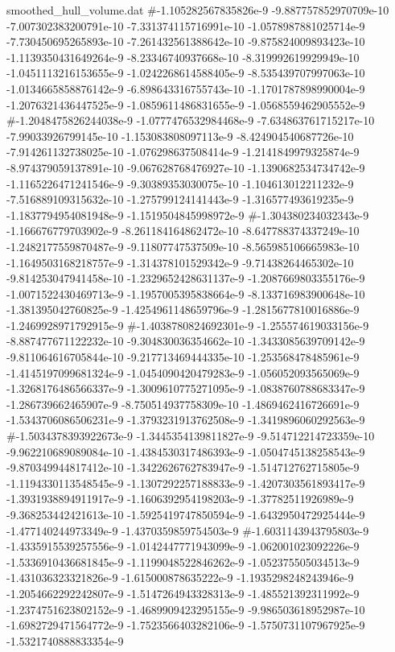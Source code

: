 \begin{filecontents}{smoothed_hull_volume.dat}
#-1.105282567835826e-9	-9.887757852970709e-10	-7.007302383200791e-10	-7.331374115716991e-10	-1.0578987881025714e-9	-7.730450695265893e-10	-7.261432561388642e-10	-9.875824009893423e-10	-1.1139350431649264e-9	-8.23346740937668e-10	-8.319992619929949e-10	-1.0451113216153655e-9	-1.0242268614588405e-9	-8.535439707997063e-10	-1.0134665858876142e-9	-6.898643316755743e-10	-1.1701787898990004e-9	-1.2076321436447525e-9	-1.0859611486831655e-9	-1.0568559462905552e-9
#-1.2048475826244038e-9	-1.0777476532984468e-9	-7.634863761715217e-10	-7.99033926799145e-10	-1.153083808097113e-9	-8.424904540687726e-10	-7.914261132738025e-10	-1.076298637508414e-9	-1.2141849979325874e-9	-8.974379059137891e-10	-9.067628768476927e-10	-1.1390682534734742e-9	-1.1165226471241546e-9	-9.30389353030075e-10	-1.104613012211232e-9	-7.516889109315632e-10	-1.275799124141443e-9	-1.316577493619235e-9	-1.1837794954081948e-9	-1.1519504845998972e-9
#-1.304380234032343e-9	-1.166676779703902e-9	-8.261184164862472e-10	-8.647788374337249e-10	-1.2482177559870487e-9	-9.11807747537509e-10	-8.565985106665983e-10	-1.1649503168218757e-9	-1.314378101529342e-9	-9.71438264465302e-10	-9.814253047941458e-10	-1.2329652428631137e-9	-1.2087669803355176e-9	-1.0071522430469713e-9	-1.1957005395838664e-9	-8.133716983900648e-10	-1.381395042760825e-9	-1.4254961148659796e-9	-1.2815677810016886e-9	-1.2469928971792915e-9
#-1.4038780824692301e-9	-1.255574619033156e-9	-8.887477671122232e-10	-9.304830036354662e-10	-1.3433085639709142e-9	-9.811064616705844e-10	-9.217713469444335e-10	-1.253568478485961e-9	-1.4145197099681324e-9	-1.0454090420479283e-9	-1.056052093565069e-9	-1.3268176486566337e-9	-1.3009610775271095e-9	-1.0838760788683347e-9	-1.286739662465907e-9	-8.750514937758309e-10	-1.4869462416726691e-9	-1.5343706086506231e-9	-1.3793231913762508e-9	-1.3419896060292563e-9
#-1.5034378393922673e-9	-1.3445354139811827e-9	-9.514712214723359e-10	-9.962210689089084e-10	-1.4384530317486393e-9	-1.0504745138258543e-9	-9.870349944817412e-10	-1.3422626762783947e-9	-1.514712762715805e-9	-1.1194330113548545e-9	-1.1307292257188833e-9	-1.4207303561893417e-9	-1.3931938894911917e-9	-1.1606392954198203e-9	-1.37782511926989e-9	-9.368253442421613e-10	-1.5925419747850594e-9	-1.6432950472925444e-9	-1.477140244973349e-9	-1.4370359859754503e-9
#-1.6031143943795803e-9	-1.4335915539257556e-9	-1.0142447771943099e-9	-1.062001023092226e-9	-1.5336910436681845e-9	-1.1199048522846262e-9	-1.052375505034513e-9	-1.431036323321826e-9	-1.615000878635222e-9	-1.1935298248243946e-9	-1.2054662292242807e-9	-1.5147264943328313e-9	-1.485521392311992e-9	-1.2374751623802152e-9	-1.4689909423295155e-9	-9.986503618952987e-10	-1.6982729471564772e-9	-1.7523566403282106e-9	-1.5750731107967925e-9	-1.5321740888833354e-9

\end{filecontents}
